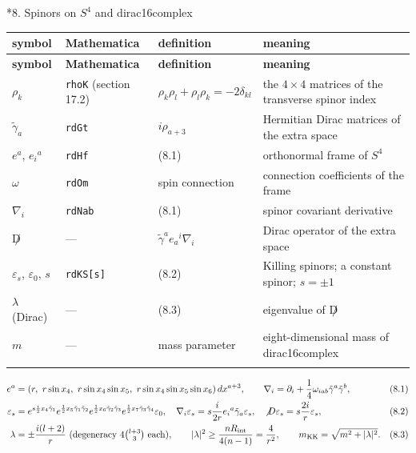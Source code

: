\documentclass[10pt,a4paper]{article}
\makeatletter
\renewcommand\section{\@startsection{section}{1}{\z@}{-3.5ex \@plus -1ex \@minus -.2ex}{2.3ex \@plus.2ex}{\normalfont\Large\bfseries\raggedright}}
\makeatother
\begin{document}
\section*{8. Spinors on \texorpdfstring{$S^4$}{S4} and dirac16complex}
{\footnotesize
\begin{longtable}{>{\raggedright\arraybackslash}p{}>{\raggedright\arraybackslash}p{}>{\raggedright\arraybackslash}p{}>{\raggedright\arraybackslash}p{}}
\toprule
\textbf{symbol} & \textbf{Mathematica} & \textbf{definition} & \textbf{meaning} \\
\midrule\endfirsthead
\toprule
\textbf{symbol} & \textbf{Mathematica} & \textbf{definition} & \textbf{meaning} \\
\midrule\endhead
\endfoot
\bottomrule\endlastfoot
$\rho_k$ & \texttt{rhoK} (section 17.2) & $\rho_k\rho_l+\rho_l\rho_k=-2\delta_{kl}$ & the $4\times4$ matrices of the transverse spinor index \\
$\tilde\gamma_a$ & \texttt{rdGt} & $i\rho_{a+3}$ & Hermitian Dirac matrices of the extra space \\
$e^a$, $e_i{}^a$ & \texttt{rdHf} & (8.1) & orthonormal frame of $S^4$ \\
$\omega$ & \texttt{rdOm} & spin connection & connection coefficients of the frame \\
$\nabla_i$ & \texttt{rdNab} & (8.1) & spinor covariant derivative \\
$\not D$ & — & $\tilde\gamma^ae_a{}^i\nabla_i$ & Dirac operator of the extra space \\
$\varepsilon_s$, $\varepsilon_0$, $s$ & \texttt{rdKS[s]} & (8.2) & Killing spinors; a constant spinor; $s=\pm1$ \\
$\lambda$ (Dirac) & — & (8.3) & eigenvalue of $\not D$ \\
$m$ & — & mass parameter & eight-dimensional mass of dirac16complex \\*
\end{longtable}}
\begin{align*}
e^a&=(r,\ r\sin x_4,\ r\sin x_4\sin x_5,\ r\sin x_4\sin x_5\sin x_6)\,dx^{a+3},\qquad \nabla_i=\partial_i+\frac14\omega_{iab}\tilde\gamma^a\tilde\gamma^b,&&(8.1) \\
\varepsilon_s&=e^{s\frac i2x_4\tilde\gamma_1}e^{\frac12x_5\tilde\gamma_1\tilde\gamma_2}e^{\frac12x_6\tilde\gamma_2\tilde\gamma_3}e^{\frac12x_7\tilde\gamma_3\tilde\gamma_4}\varepsilon_0,\quad \nabla_i\varepsilon_s=s\frac i{2r}e_i{}^a\tilde\gamma_a\varepsilon_s,\quad \not D\varepsilon_s=s\frac{2i}r\varepsilon_s,&&(8.2) \\
\lambda&=\pm\frac{i(l+2)}r\ \text{(degeneracy }4\tbinom{l+3}3\text{ each)},\qquad |\lambda|^2\ge\frac{nR_{\rm int}}{4(n-1)}=\frac4{r^2},\qquad m_{\rm KK}=\sqrt{m^2+|\lambda|^2}.&&(8.3)
\end{align*}
\end{document}
